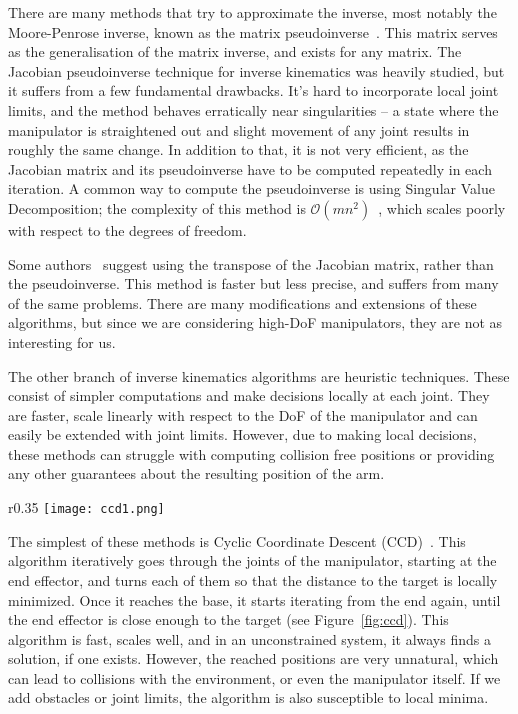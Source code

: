 There are many methods that try to approximate the inverse, most notably the Moore-Penrose inverse, known as the matrix pseudoinverse~\cite{penrose_1955}. This matrix serves as the generalisation of the matrix inverse, and exists for any matrix. The Jacobian pseudoinverse technique for inverse kinematics was heavily studied, but it suffers from a few fundamental drawbacks. It's hard to incorporate local joint limits, and the method behaves erratically near singularities -- a state where the manipulator is straightened out and slight movement of any joint results in roughly the same change.
In addition to that, it is not very efficient, as the Jacobian matrix and its pseudoinverse have to be computed repeatedly in each iteration. A common way to compute the pseudoinverse is using Singular Value Decomposition; the complexity of this method is $\mathcal{O}(mn^2)$~\cite{trefethen1997numerical}, which scales poorly with respect to the degrees of freedom.

Some authors~\cite{Wolovich1984ACT} suggest using the transpose of the Jacobian matrix, rather than the pseudoinverse. This method is faster but less precise, and suffers from many of the same problems. There are many modifications and extensions of these algorithms, but since we are considering high-DoF manipulators, they are not as interesting for us.

The other branch of inverse kinematics algorithms are heuristic techniques. These consist of simpler computations and make decisions locally at each joint. They are faster, scale linearly with respect to the DoF of the manipulator and can easily be extended with joint limits. However, due to making local decisions, these methods can struggle with computing collision free positions or providing any other guarantees about the resulting position of the arm.

\begin{wrapfigure}{r}{0.35\textwidth}
    \centering
    \texttt{[image: ccd1.png]}
    \caption{\\CCD algorithm~\cite{Ondika2021thesis}: The angles are repeatedly computed for each joint until a solution is found}
    \label{fig:ccd}
\end{wrapfigure}

The simplest of these methods is Cyclic Coordinate Descent (CCD)~\cite{ccd}. This algorithm iteratively goes through the joints of the manipulator, starting at the end effector, and turns each of them so that the distance to the target is locally minimized. Once it reaches the base, it starts iterating from the end again, until the end effector is close enough to the target (see Figure~\ref{fig:ccd}). This algorithm is fast, scales well, and in an unconstrained system, it always finds a solution, if one exists. However, the reached positions are very unnatural, which can lead to collisions with the environment, or even the manipulator itself. If we add obstacles or joint limits, the algorithm is also susceptible to local minima.

